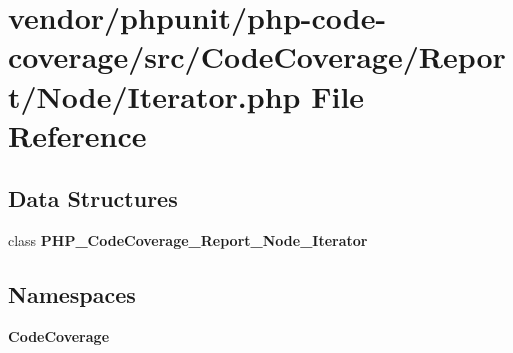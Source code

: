 \section{vendor/phpunit/php-\/code-\/coverage/src/\+Code\+Coverage/\+Report/\+Node/\+Iterator.php File Reference}
\label{phpunit_2php-code-coverage_2src_2_code_coverage_2_report_2_node_2_iterator_8php}
\subsection*{Data Structures}
\begin{DoxyCompactItemize}
\item 
class {\bf P\+H\+P\+\_\+\+Code\+Coverage\+\_\+\+Report\+\_\+\+Node\+\_\+\+Iterator}
\end{DoxyCompactItemize}
\subsection*{Namespaces}
\begin{DoxyCompactItemize}
\item 
 {\bf Code\+Coverage}
\end{DoxyCompactItemize}
